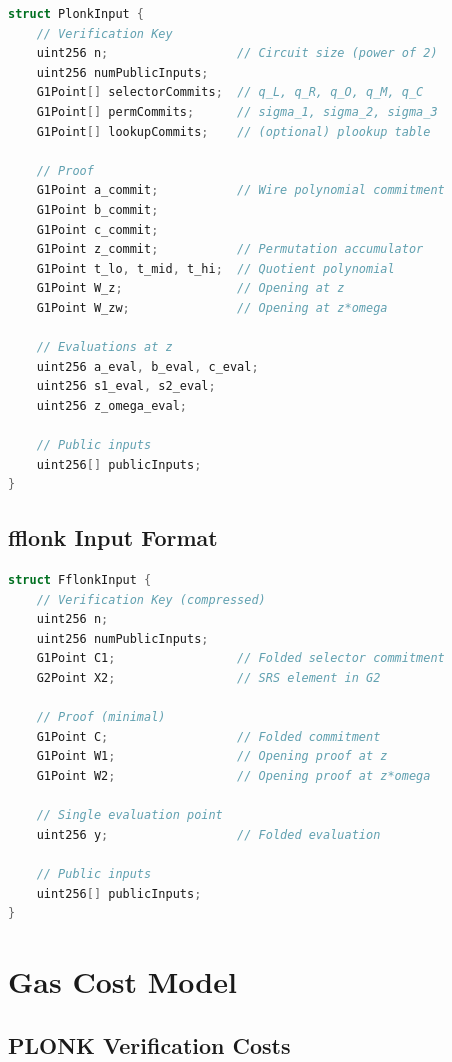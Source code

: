 \documentclass[11pt,a4paper]{article}
\theoremstyle{definition}
\begin{document}
\begin{lstlisting}[language=C]
struct PlonkInput {
    // Verification Key
    uint256 n;                  // Circuit size (power of 2)
    uint256 numPublicInputs;
    G1Point[] selectorCommits;  // q_L, q_R, q_O, q_M, q_C
    G1Point[] permCommits;      // sigma_1, sigma_2, sigma_3
    G1Point[] lookupCommits;    // (optional) plookup table

    // Proof
    G1Point a_commit;           // Wire polynomial commitment
    G1Point b_commit;
    G1Point c_commit;
    G1Point z_commit;           // Permutation accumulator
    G1Point t_lo, t_mid, t_hi;  // Quotient polynomial
    G1Point W_z;                // Opening at z
    G1Point W_zw;               // Opening at z*omega

    // Evaluations at z
    uint256 a_eval, b_eval, c_eval;
    uint256 s1_eval, s2_eval;
    uint256 z_omega_eval;

    // Public inputs
    uint256[] publicInputs;
}
\end{lstlisting}

\subsection{fflonk Input Format}

\begin{lstlisting}[language=C]
struct FflonkInput {
    // Verification Key (compressed)
    uint256 n;
    uint256 numPublicInputs;
    G1Point C1;                 // Folded selector commitment
    G2Point X2;                 // SRS element in G2

    // Proof (minimal)
    G1Point C;                  // Folded commitment
    G1Point W1;                 // Opening proof at z
    G1Point W2;                 // Opening proof at z*omega

    // Single evaluation point
    uint256 y;                  // Folded evaluation

    // Public inputs
    uint256[] publicInputs;
}
\end{lstlisting}

\section{Gas Cost Model}

\subsection{PLONK Verification Costs}
\end{document}
